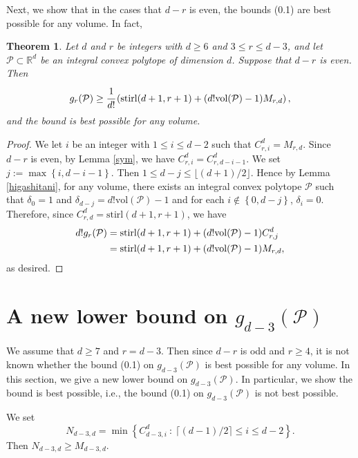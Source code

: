 \documentclass[12pt]{amsart}
\newtheorem{theorem}{Theorem}[section]
\theoremstyle{definition}
\theoremstyle{remark}
\numberwithin{equation}{section}
\def\Pc{{\mathcal P}}
\def\NZQ{\mathbb}               %
\def\RR{{\NZQ R}}
\begin{document}
Next, we show that in the cases that $d-r$ is even, the bounds (0.1) are best possible for any volume.
In fact,
\begin{theorem}
	\label{even}
	Let  $d$ and $r$ be integers with $d \geq 6$ and $3 \leq r \leq d-3$, and let $\Pc \subset \RR^d$ be an integral convex polytope of dimension $d$.
	Suppose that $d-r$ is even.
	Then
	$$g_r(\Pc) \geq \cfrac{1}{d!}\left(\textnormal{stirl}(d+1,r+1)+(d!\textnormal{vol}(\Pc)-1)M_{r,d}\right),$$
	and the bound is best possible for any volume.
\end{theorem}
\begin{proof}
	We let $i$ be an integer with $1 \leq i \leq d-2$ such that  $C_{r,i}^d=M_{r,d}$.
	Since $d-r$ is even, by Lemma \ref{sym}, we have $C_{r,i}^d=C_{r,d-i-1}^d$.
	We set $j:= \max\left\{i,d-i-1\right\}$.
	Then $1 \leq d-j \leq \lfloor(d+1)/2 \rfloor$.
	Hence by Lemma \ref{higashitani}, for any volume, there exists an integral convex polytope $\Pc$ such that $\delta_0=1$ and $\delta_{d-j}=d!\text{vol}(\Pc)-1$ and for each $i \notin \left\{0,d-j\right\}$, $\delta_i=0$.
	Therefore, since $C_{r,d}^d=\text{stirl}(d+1,r+1)$, we have
	\begin{displaymath}
	\begin{aligned}
	d!g_r(\Pc) %
	&=\textnormal{stirl}(d+1,r+1)+(d!\textnormal{vol}(\Pc)-1)C^d_{r,j}\\
	&=\textnormal{stirl}(d+1,r+1)+(d!\textnormal{vol}(\Pc)-1)M_{r,d},
	\end{aligned}
	\end{displaymath}
	as desired.
\end{proof}
\section{A new lower bound on $g_{d-3}(\Pc)$}
We assume that $d\geq 7$ and  $r=d-3$.
Then since $d-r$ is odd and $r \geq 4$, it is not known whether the bound (0.1) on $g_{d-3}(\Pc)$ is best possible for any volume.
In this section, we give a new lower bound on $g_{d-3}(\Pc)$.
In particular, we show the bound is best possible, i.e., the bound (0.1) on  $g_{d-3}(\Pc)$ is not best possible.

We set
$$N_{d-3,d}=\min\left\{C^d_{d-3,i}\ : \ \lceil (d-1)/2 \rceil \leq i \leq d-2 \right\}.$$ 
Then $N_{d-3,d} \geq M_{d-3,d}$.
\end{document}
